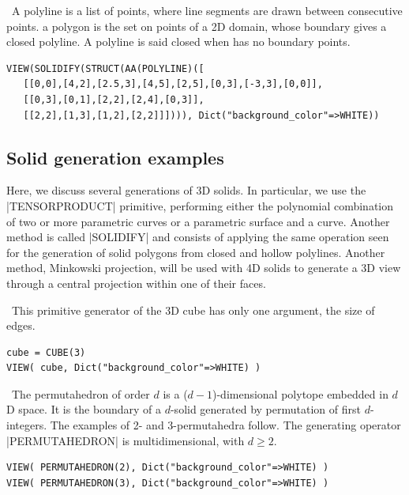 \begin{coding}[Algebraic computation of FE = $\delta_1$]
\begin{condition}\
A polyline is a list of points, where line segments are drawn between consecutive points.  a polygon is the set on points of a 2D domain, whose boundary gives a closed polyline. A polyline is said closed when has no boundary points.
\begin{lstlisting}[language=JuliaLocal, style=julia, mathescape=true]
VIEW(SOLIDIFY(STRUCT(AA(POLYLINE)([
   [[0,0],[4,2],[2.5,3],[4,5],[2,5],[0,3],[-3,3],[0,0]],
   [[0,3],[0,1],[2,2],[2,4],[0,3]],
   [[2,2],[1,3],[1,2],[2,2]]]))), Dict("background_color"=>WHITE))
\end{lstlisting}
\end{condition}





\subsection{ Solid generation examples}\label{sect:5-4-3}

Here, we discuss several generations of 3D solids. In particular, we use the |TENSORPRODUCT| primitive, performing either the polynomial combination of two or more parametric curves or a parametric surface and a curve. Another method is called |SOLIDIFY| and consists of applying the same operation seen for the generation of solid polygons from closed and hollow polylines.
Another method, Minkowski projection, will be used with 4D solids to generate a 3D view through a central projection within one of their faces.

\begin{condition}[CUBE primitive]\
This primitive generator of the 3D cube has only one argument, the size of edges. 
\begin{lstlisting}[language=JuliaLocal, style=julia, mathescape=true]
cube = CUBE(3)
VIEW( cube, Dict("background_color"=>WHITE) )
\end{lstlisting}
\end{condition}


\begin{condition}[$d$-Permutahedron]\ 
The permutahedron of order $d$ is a ($d−1$)-dimensional polytope embedded in $d$D space. It is the boundary of a $d$-solid generated by permutation of first $d$-integers. The examples of 2- and 3-permutahedra follow. The generating operator |PERMUTAHEDRON| is multidimensional, with $d\geq 2$.
\begin{lstlisting}[language=JuliaLocal, style=julia, mathescape=true]
VIEW( PERMUTAHEDRON(2), Dict("background_color"=>WHITE) )
VIEW( PERMUTAHEDRON(3), Dict("background_color"=>WHITE) )
\end{lstlisting}
\end{condition}



\end{coding}
